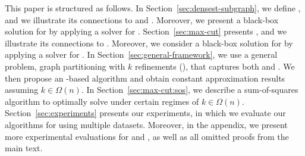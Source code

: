 \vspace{1mm}
This paper is structured as follows.
In Section~\ref{sec:densest-subgraph}, we define \dskc, and we illustrate its
connections to \kdense and \dks. Moreover, we present a black-box
solution for \dskc by applying a solver for \dks. 
Section~\ref{sec:max-cut} presents \maxcutkc, and we illustrate its connections
to \ccmaxcut. Moreover, we consider a black-box solution for \maxcutkc by applying a solver for \maxcut. 
In Section~\ref{sec:general-framework}, we use a general problem, graph
partitioning with $k$ refinements (\gpkc), that captures both \dskc and
\maxcutkc. We then propose an \sdp-based algorithm and
obtain constant approximation results assuming $k \in \Omega(n)$. 
In Section~\ref{sec:max-cut:sos}, we describe a sum-of-squares algorithm to optimally solve \maxcutkc under certain regimes of $k \in \Omega(n)$.
Section~\ref{sec:experiments} presents our experiments, in which we evaluate our
algorithms for \dskc using multiple datasets. Moreover, in the appendix, we present more
experimental evaluations for \dskc and \maxcutkc, as well as all
omitted proofs from the main text.